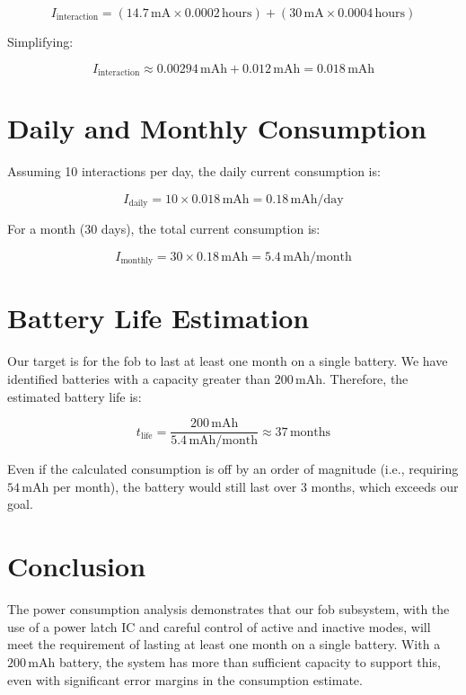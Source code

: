 \documentclass{article}
\begin{document}
\[
I_{\text{interaction}} = (14.7 \, \text{mA} \times 0.0002 \, \text{hours}) + (30 \, \text{mA} \times 0.0004 \, \text{hours})
\]

Simplifying:

\[
I_{\text{interaction}} \approx 0.00294 \, \text{mAh} + 0.012 \, \text{mAh} = 0.018 \, \text{mAh}
\]

\section{Daily and Monthly Consumption}
Assuming 10 interactions per day, the daily current consumption is:

\[
I_{\text{daily}} = 10 \times 0.018 \, \text{mAh} = 0.18 \, \text{mAh/day}
\]

For a month (30 days), the total current consumption is:

\[
I_{\text{monthly}} = 30 \times 0.18 \, \text{mAh} = 5.4 \, \text{mAh/month}
\]

\section{Battery Life Estimation}
Our target is for the fob to last at least one month on a single battery. We have identified batteries with a capacity greater than \(200 \, \text{mAh}\). Therefore, the estimated battery life is:

\[
t_{\text{life}} = \frac{200 \, \text{mAh}}{5.4 \, \text{mAh/month}} \approx 37 \, \text{months}
\]

Even if the calculated consumption is off by an order of magnitude (i.e., requiring \(54 \, \text{mAh}\) per month), the battery would still last over 3 months, which exceeds our goal.

\section{Conclusion}
The power consumption analysis demonstrates that our fob subsystem, with the use of a power latch IC and careful control of active and inactive modes, will meet the requirement of lasting at least one month on a single battery. With a \(200 \, \text{mAh}\) battery, the system has more than sufficient capacity to support this, even with significant error margins in the consumption estimate.
\end{document}
